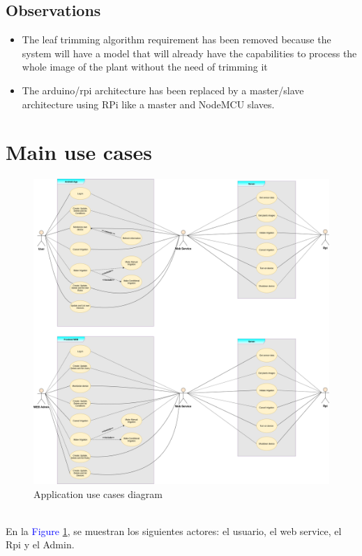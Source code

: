\documentclass[11pt,a4paper]{article}
\begin{document}
\subsection{Observations}
\begin{itemize}
\item The leaf trimming algorithm requirement has been removed because the system will have a model that will already have the capabilities to process the whole image of the plant without the need of trimming it
\item The arduino/rpi architecture has been replaced by a master/slave architecture using RPi like a master and NodeMCU slaves.
\end{itemize}

\newpage

\section{Main use cases}
\begin{figure}[hbtp]
\centering
\includegraphics[scale=0.300,angle=0,origin=c]{figures/DCU.png}
\caption{Application use cases diagram}
\label{figure2}
\end{figure} \newpage\leavevmode \\
En la \textcolor{blue}{Figure \ref{figure2}}, se muestran los siguientes actores: el usuario, el web service, el Rpi y el Admin.\newline\newline
\end{document}
